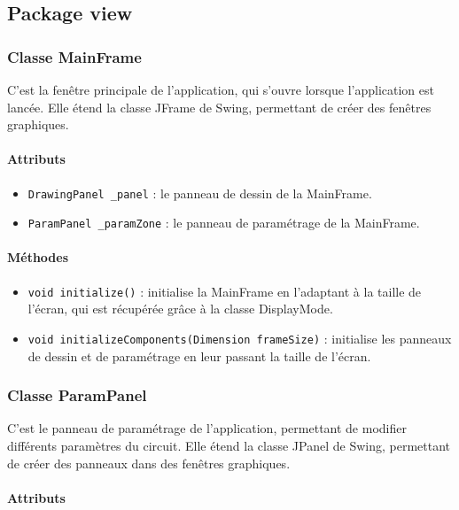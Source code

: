 \documentclass{report}
\begin{document}
\newpage
\subsection{Package view}

\subsubsection{Classe MainFrame}

C'est la fenêtre principale de l'application, qui s'ouvre lorsque l'application est lancée. Elle étend la classe JFrame de Swing, permettant de créer des fenêtres graphiques.

\paragraph*{Attributs}

\begin{itemize}
\item \texttt{DrawingPanel \_panel} : le panneau de dessin de la MainFrame.
\item \texttt{ParamPanel \_paramZone} : le panneau de paramétrage de la MainFrame.
\end{itemize}

\paragraph*{Méthodes}

\begin{itemize}
\item \texttt{void initialize()} : initialise la MainFrame en l'adaptant à la taille de l'écran, qui est récupérée grâce à la classe DisplayMode.
\item \texttt{void initializeComponents(Dimension frameSize)} : initialise les panneaux de dessin et de paramétrage en leur passant la taille de l'écran.
\end{itemize}


\subsubsection{Classe ParamPanel}

C'est le panneau de paramétrage de l'application, permettant de modifier différents paramètres du circuit. Elle étend la classe JPanel de Swing, permettant de créer des panneaux dans des fenêtres graphiques.

\paragraph*{Attributs}
\end{document}
